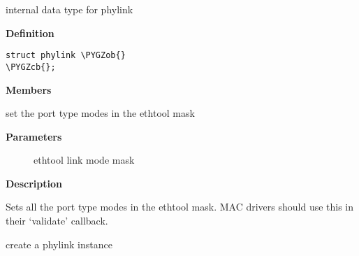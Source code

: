 \documentclass[a4paper,8pt,english]{sphinxmanual}
\def\PYGZob{\char`\{}
\def\PYGZcb{\char`\}}
\begin{document}
\begin{fulllineitems}
\label{networking/kapi:c.phylink}
internal data type for phylink

\end{fulllineitems}


\textbf{Definition}

\begin{Verbatim}[commandchars=\\\{\}]
struct phylink \PYGZob{}
\PYGZcb{};
\end{Verbatim}

\textbf{Members}

\begin{fulllineitems}
\label{networking/kapi:c.phylink_set_port_modes}
set the port type modes in the ethtool mask

\end{fulllineitems}


\textbf{Parameters}
\begin{description}
\item[{}] \leavevmode
ethtool link mode mask

\end{description}

\textbf{Description}

Sets all the port type modes in the ethtool mask.  MAC drivers should
use this in their `validate' callback.

\begin{fulllineitems}
\label{networking/kapi:c.phylink_create}
create a phylink instance

\end{fulllineitems}
\end{document}
